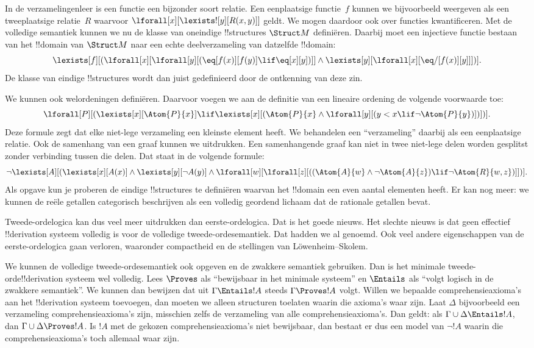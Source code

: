 \documentclass[../../../include/open-logic-section]{subfiles}
\begin{document}
In de verzamelingenleer is een functie een bijzonder soort relatie. Een
eenplaatsige functie~$f$ kunnen we bijvoorbeeld weergeven als een
tweeplaatsige relatie~$R$ waarvoor
$\lforall[x][\lexists![y][R(x,y)]]$ geldt. We mogen daardoor ook over
functies kwantificeren. Met de volledige semantiek kunnen we nu de klasse van
oneindige !!{structure}s $\Struct M$ definiëren. Daarbij moet een injectieve
functie bestaan van het !!{domain} van $\Struct M$ naar een echte
deelverzameling van datzelfde !!{domain}:
\[
\lexists[f][(\lforall[x][\lforall[y][(\eq[f(x)][f(y)] \lif \eq[x][y])]]
  \land \lexists[y][\lforall[x][\eq/[f(x)][y]]])].
\]
De klasse van eindige !!{structure}s wordt dan juist gedefinieerd door de
ontkenning van deze zin.

We kunnen ook welordeningen definiëren. Daarvoor voegen we aan de definitie
van een lineaire ordening de volgende voorwaarde toe:
\[
\lforall[P][(\lexists[x][\Atom{P}{x}] \lif \lexists[x][(\Atom{P}{x}
    \land \lforall[y][(y < x \lif \lnot \Atom{P}{y})])])].
\]
Deze formule zegt dat elke niet-lege verzameling een kleinste element heeft.
We behandelen een ``verzameling'' daarbij als een eenplaatsige relatie. Ook
de samenhang van een graaf kunnen we uitdrukken. Een samenhangende graaf kan
niet in twee niet-lege delen worden gesplitst zonder verbinding tussen die
delen. Dat staat in de volgende formule:
\[
\lnot \lexists[A][(\lexists[x][A(x)] \land \lexists[y][\lnot A(y)]
  \land \lforall[w][\lforall[z][((\Atom{A}{w} \land \lnot \Atom{A}{z})
      \lif \lnot \Atom{R}{w,z})]])].
\]
Als opgave kun je proberen de eindige !!{structure}s te definiëren waarvan
het !!{domain} een even aantal elementen heeft. Er kan nog meer: we kunnen de
reële getallen categorisch beschrijven als een volledig geordend lichaam dat
de rationale getallen bevat.

Tweede-ordelogica kan dus veel meer uitdrukken dan eerste-ordelogica. Dat is
het goede nieuws. Het slechte nieuws is dat geen effectief !!{derivation}
systeem volledig is voor de volledige tweede-ordesemantiek. Dat hadden we al
genoemd. Ook veel andere eigenschappen van de eerste-ordelogica gaan verloren,
waaronder compactheid en de stellingen van L\"owenheim--Skolem.

We kunnen de volledige tweede-ordesemantiek ook opgeven en de zwakkere
semantiek gebruiken. Dan is het minimale tweede-orde!!{derivation} systeem
wel volledig. Lees $\Proves$ als ``bewijsbaar in het minimale systeem'' en
$\Entails$ als ``volgt logisch in de zwakkere semantiek''. We kunnen dan
bewijzen dat uit $\Gamma \Entails !A$ steeds $\Gamma \Proves !A$ volgt. Willen we
bepaalde comprehensieaxioma's aan het !!{derivation} systeem toevoegen, dan
moeten we alleen structuren toelaten waarin die axioma's waar zijn. Laat
$\Delta$ bijvoorbeeld een verzameling comprehensieaxioma's zijn, misschien
zelfs de verzameling van alle comprehensieaxioma's. Dan geldt: als
$\Gamma \cup \Delta \Entails !A$, dan
$\Gamma \cup \Delta \Proves !A$. Is $!A$ met de gekozen
comprehensieaxioma's niet bewijsbaar, dan bestaat er dus een model van
$\lnot !A$ waarin die comprehensieaxioma's toch allemaal waar zijn.
\end{document}
